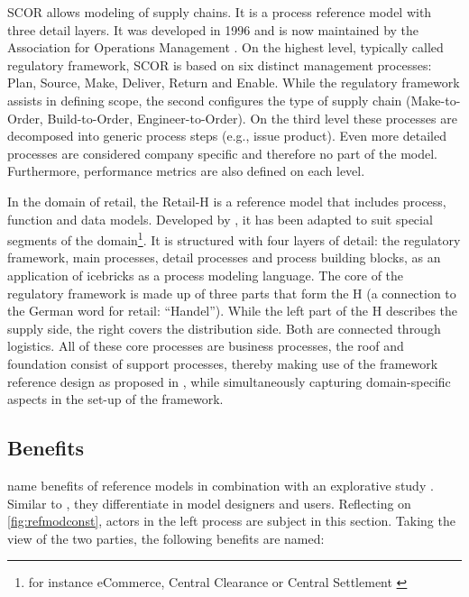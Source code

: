 		\acrshort{SCOR} allows modeling of supply chains. It is a process reference model with three detail layers. It was developed in 1996 and is now maintained by the Association for Operations Management \citep{APICS2015}. On the highest level, typically called regulatory framework, \acrshort{SCOR}  is based on six distinct management processes: Plan, Source, Make, Deliver, Return and Enable. While the regulatory framework assists in defining scope, the second configures the type of supply chain (Make-to-Order, Build-to-Order, Engineer-to-Order). On the third level these processes are decomposed into generic process steps (e.g., issue product). Even more detailed processes are considered company specific and therefore no part of the model. Furthermore, performance metrics are also defined on each level. 
	
		\label{mod:retail}
		In the domain of retail, the Retail-H is a reference model that includes process, function and data models. Developed by \cite{becker2004handelsinformationssysteme}, it has been adapted to suit special segments of the domain\footnote{for instance eCommerce, Central Clearance or Central Settlement \citep{Puster2015}}. 
		It is structured with four layers of detail: the regulatory framework, main processes, detail processes and process building blocks, as an application of icebricks as a process modeling language. The core of the regulatory framework is made up of three parts that form the H (a connection to the German word for retail: \enquote{Handel}). While the left part of the H describes the supply side, the right covers the distribution side. Both are connected through logistics. All of these core processes are business processes, the roof and foundation consist of support processes, thereby making use of the framework reference design as proposed in \cite{Meise2001}, while simultaneously capturing domain-specific aspects in the set-up of the framework.  
		
	
		


		\subsection{Benefits}
		
		\citeauthor{becker2004handelsinformationssysteme} name benefits of reference models in combination with an explorative study \citep[]{Schutte1998}. Similar to \cite{vom2006reusable}, they differentiate in model designers and users. Reflecting on \Fig \ref{fig:refmodconst}, actors in the left process are subject in this section. Taking the view of the two parties, the following benefits are named:
		
